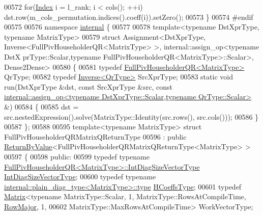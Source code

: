 \begin{DoxyCode}
00572   \textcolor{keywordflow}{for}(\hyperlink{namespace_eigen_a62e77e0933482dafde8fe197d9a2cfde}{Index} i = l\_rank; i < cols(); ++i) dst.row(m\_cols\_permutation.indices().coeff(i)).setZero();
00573 \}
00574 \textcolor{preprocessor}{#endif}
00575 
00576 \textcolor{keyword}{namespace }\hyperlink{namespaceinternal}{internal} \{
00577   
00578 \textcolor{keyword}{template}<\textcolor{keyword}{typename} DstXprType, \textcolor{keyword}{typename} MatrixType>
00579 \textcolor{keyword}{struct }Assignment<DstXprType, Inverse<FullPivHouseholderQR<MatrixType> >, internal::assign\_op<typename DstX
      prType::Scalar,typename FullPivHouseholderQR<MatrixType>::Scalar>, Dense2Dense>
00580 \{
00581   \textcolor{keyword}{typedef} \hyperlink{group___q_r___module}{FullPivHouseholderQR<MatrixType>} QrType;
00582   \textcolor{keyword}{typedef} \hyperlink{class_eigen_1_1_inverse}{Inverse<QrType>} SrcXprType;
00583   \textcolor{keyword}{static} \textcolor{keywordtype}{void} run(DstXprType &dst, \textcolor{keyword}{const} SrcXprType &src, \textcolor{keyword}{const} 
      \hyperlink{struct_eigen_1_1internal_1_1assign__op}{internal::assign\_op<typename DstXprType::Scalar,typename QrType::Scalar>}
       &)
00584   \{    
00585     dst = src.nestedExpression().solve(MatrixType::Identity(src.rows(), src.cols()));
00586   \}
00587 \};
00588 
00595 \textcolor{keyword}{template}<\textcolor{keyword}{typename} MatrixType> \textcolor{keyword}{struct }FullPivHouseholderQRMatrixQReturnType
00596   : \textcolor{keyword}{public} \hyperlink{group___core___module_class_eigen_1_1_return_by_value}{ReturnByValue}<FullPivHouseholderQRMatrixQReturnType<MatrixType> >
00597 \{
00598 \textcolor{keyword}{public}:
00599   \textcolor{keyword}{typedef} \textcolor{keyword}{typename} \hyperlink{group___q_r___module_class_eigen_1_1_full_piv_householder_q_r}{FullPivHouseholderQR<MatrixType>::IntDiagSizeVectorType}
       \hyperlink{group___core___module}{IntDiagSizeVectorType};
00600   \textcolor{keyword}{typedef} \textcolor{keyword}{typename} \hyperlink{class_eigen_1_1internal_1_1_tensor_lazy_evaluator_writable}{internal::plain\_diag\_type<MatrixType>::type} 
      \hyperlink{class_eigen_1_1internal_1_1_tensor_lazy_evaluator_writable}{HCoeffsType};
00601   \textcolor{keyword}{typedef} \hyperlink{group___core___module_class_eigen_1_1_matrix}{Matrix}<\textcolor{keyword}{typename} MatrixType::Scalar, 1, MatrixType::RowsAtCompileTime, 
      \hyperlink{group__enums_ggaacded1a18ae58b0f554751f6cdf9eb13acfcde9cd8677c5f7caf6bd603666aae3}{RowMajor}, 1,
00602                  MatrixType::MaxRowsAtCompileTime> WorkVectorType;

\end{DoxyCode}
